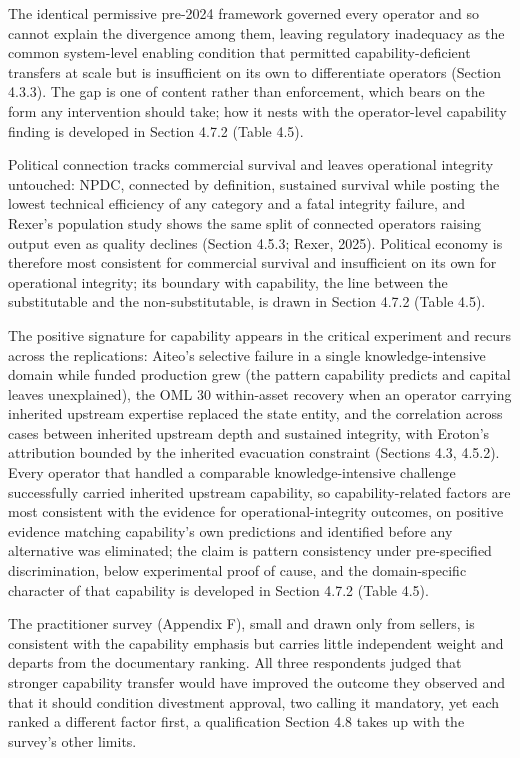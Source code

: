 \documentclass[twoside,fontset=lmodern]{mitthesis}
\begin{document}
The identical permissive pre-2024 framework governed every operator and
so cannot explain the divergence among them, leaving regulatory
inadequacy as the common system-level enabling condition that permitted
capability-deficient transfers at scale but is insufficient on its own
to differentiate operators (Section 4.3.3). The gap is one of content
rather than enforcement, which bears on the form any intervention should
take; how it nests with the operator-level capability finding is
developed in Section 4.7.2 (Table 4.5).

Political connection tracks commercial survival and leaves operational
integrity untouched: NPDC, connected by definition, sustained survival
while posting the lowest technical efficiency of any category and a
fatal integrity failure, and Rexer's population study shows the same
split of connected operators raising output even as quality declines
(Section 4.5.3; Rexer, 2025). Political economy is therefore most
consistent for commercial survival and insufficient on its own for
operational integrity; its boundary with capability, the line between
the substitutable and the non-substitutable, is drawn in Section 4.7.2
(Table 4.5).

The positive signature for capability appears in the critical experiment
and recurs across the replications: Aiteo's selective failure in a
single knowledge-intensive domain while funded production grew (the
pattern capability predicts and capital leaves unexplained), the OML 30
within-asset recovery when an operator carrying inherited upstream
expertise replaced the state entity, and the correlation across cases
between inherited upstream depth and sustained integrity, with Eroton's
attribution bounded by the inherited evacuation constraint (Sections
4.3, 4.5.2). Every operator that handled a comparable
knowledge-intensive challenge successfully carried inherited upstream
capability, so capability-related factors are most consistent with the
evidence for operational-integrity outcomes, on positive evidence
matching capability's own predictions and identified before any
alternative was eliminated; the claim is pattern consistency under
pre-specified discrimination, below experimental proof of cause, and the
domain-specific character of that capability is developed in Section
4.7.2 (Table 4.5).

The practitioner survey (Appendix F), small and drawn only from sellers,
is consistent with the capability emphasis but carries little
independent weight and departs from the documentary ranking. All three
respondents judged that stronger capability transfer would have improved
the outcome they observed and that it should condition divestment
approval, two calling it mandatory, yet each ranked a different factor
first, a qualification Section 4.8 takes up with the survey's other
limits.
\end{document}
